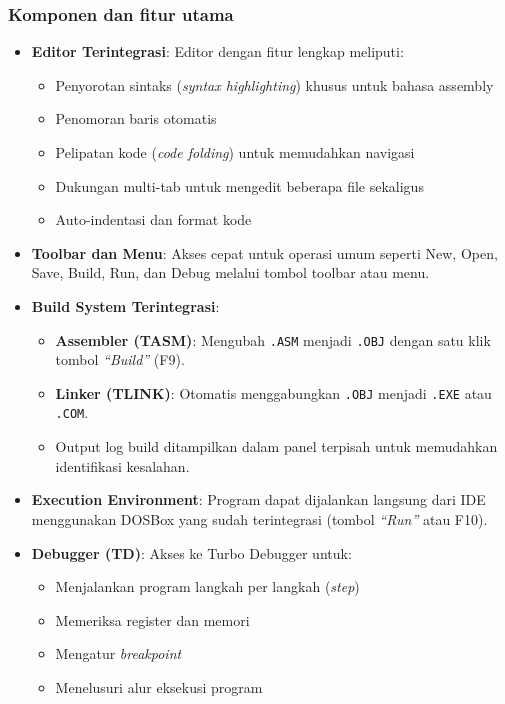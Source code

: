 \documentclass[../main.tex]{subfiles}
\begin{document}
            \subsubsection{Komponen dan fitur utama}
\begin{itemize}
    \item \textbf{Editor Terintegrasi}: Editor dengan fitur lengkap meliputi:
    \begin{itemize}
        \item Penyorotan sintaks (\textit{syntax highlighting}) khusus untuk bahasa assembly
        \item Penomoran baris otomatis
        \item Pelipatan kode (\textit{code folding}) untuk memudahkan navigasi
        \item Dukungan multi-tab untuk mengedit beberapa file sekaligus
        \item Auto-indentasi dan format kode
    \end{itemize}
    
    \item \textbf{Toolbar dan Menu}: Akses cepat untuk operasi umum seperti New, Open, Save, Build, Run, dan Debug melalui tombol toolbar atau menu.
    
    \item \textbf{Build System Terintegrasi}: 
    \begin{itemize}
        \item \textbf{Assembler (TASM)}: Mengubah \texttt{.ASM} menjadi \texttt{.OBJ} dengan satu klik tombol \textit{``Build''} (F9).
        \item \textbf{Linker (TLINK)}: Otomatis menggabungkan \texttt{.OBJ} menjadi \texttt{.EXE} atau \texttt{.COM}.
        \item Output log build ditampilkan dalam panel terpisah untuk memudahkan identifikasi kesalahan.
    \end{itemize}
    
    \item \textbf{Execution Environment}: Program dapat dijalankan langsung dari IDE menggunakan DOSBox yang sudah terintegrasi (tombol \textit{``Run''} atau F10).
    
    \item \textbf{Debugger (TD)}: Akses ke Turbo Debugger untuk:
    \begin{itemize}
        \item Menjalankan program langkah per langkah (\textit{step})
        \item Memeriksa register dan memori
        \item Mengatur \textit{breakpoint}
        \item Menelusuri alur eksekusi program
    \end{itemize}
    

\end{itemize}
\end{document}

